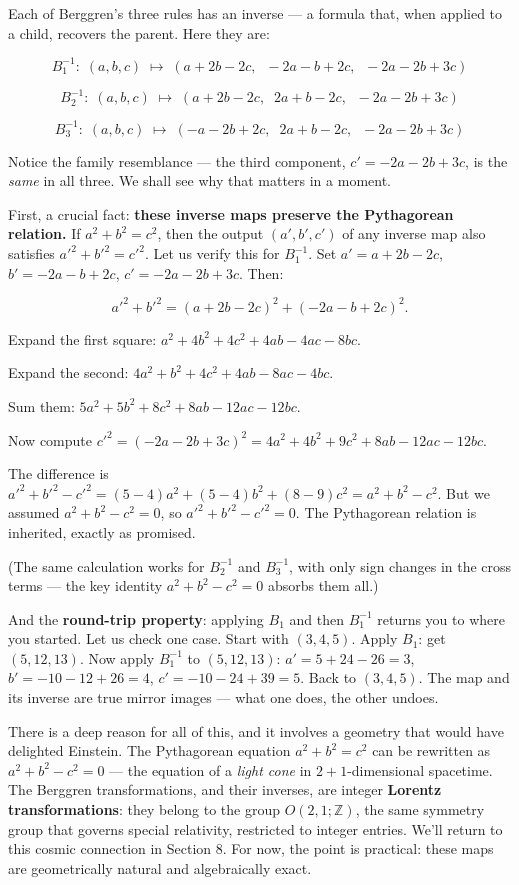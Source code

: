 \documentclass[12pt, letterpaper, openany]{book}
\theoremstyle{definition}
\theoremstyle{remark}
\begin{document}
Each of Berggren's three rules has an inverse --- a formula that, when applied to a child, recovers the parent. Here they are:

\[
B_1^{-1}:\; (a,b,c) \;\longmapsto\; (a + 2b - 2c,\;\; -2a - b + 2c,\;\; -2a - 2b + 3c)
\]

\[
B_2^{-1}:\; (a,b,c) \;\longmapsto\; (a + 2b - 2c,\;\; 2a + b - 2c,\;\; -2a - 2b + 3c)
\]

\[
B_3^{-1}:\; (a,b,c) \;\longmapsto\; (-a - 2b + 2c,\;\; 2a + b - 2c,\;\; -2a - 2b + 3c)
\]

Notice the family resemblance --- the third component, $c' = -2a - 2b + 3c$, is the \textit{same} in all three. We shall see why that matters in a moment.

First, a crucial fact: \textbf{these inverse maps preserve the Pythagorean relation.} If $a^2 + b^2 = c^2$, then the output $(a', b', c')$ of any inverse map also satisfies ${a'}^2 + {b'}^2 = {c'}^2$. Let us verify this for $B_1^{-1}$. Set $a' = a + 2b - 2c$, $b' = -2a - b + 2c$, $c' = -2a - 2b + 3c$. Then:

\[
{a'}^2 + {b'}^2 = (a + 2b - 2c)^2 + (-2a - b + 2c)^2.
\]

Expand the first square: $a^2 + 4b^2 + 4c^2 + 4ab - 4ac - 8bc$.

Expand the second: $4a^2 + b^2 + 4c^2 + 4ab - 8ac - 4bc$.

Sum them: $5a^2 + 5b^2 + 8c^2 + 8ab - 12ac - 12bc$.

Now compute ${c'}^2 = (-2a - 2b + 3c)^2 = 4a^2 + 4b^2 + 9c^2 + 8ab - 12ac - 12bc$.

The difference is ${a'}^2 + {b'}^2 - {c'}^2 = (5-4)a^2 + (5-4)b^2 + (8-9)c^2 = a^2 + b^2 - c^2$. But we assumed $a^2 + b^2 - c^2 = 0$, so ${a'}^2 + {b'}^2 - {c'}^2 = 0$. The Pythagorean relation is inherited, exactly as promised.

(The same calculation works for $B_2^{-1}$ and $B_3^{-1}$, with only sign changes in the cross terms --- the key identity $a^2 + b^2 - c^2 = 0$ absorbs them all.)

And the \textbf{round-trip property}: applying $B_1$ and then $B_1^{-1}$ returns you to where you started. Let us check one case. Start with $(3, 4, 5)$. Apply $B_1$: get $(5, 12, 13)$. Now apply $B_1^{-1}$ to $(5, 12, 13)$: $a' = 5 + 24 - 26 = 3$, $b' = -10 - 12 + 26 = 4$, $c' = -10 - 24 + 39 = 5$. Back to $(3, 4, 5)$. The map and its inverse are true mirror images --- what one does, the other undoes.

There is a deep reason for all of this, and it involves a geometry that would have delighted Einstein. The Pythagorean equation $a^2 + b^2 = c^2$ can be rewritten as $a^2 + b^2 - c^2 = 0$ --- the equation of a \textit{light cone} in $2+1$-dimensional spacetime. The Berggren transformations, and their inverses, are integer \textbf{Lorentz transformations}: they belong to the group $O(2,1;\mathbb{Z})$, the same symmetry group that governs special relativity, restricted to integer entries. We'll return to this cosmic connection in Section 8. For now, the point is practical: these maps are geometrically natural and algebraically exact.
\end{document}
